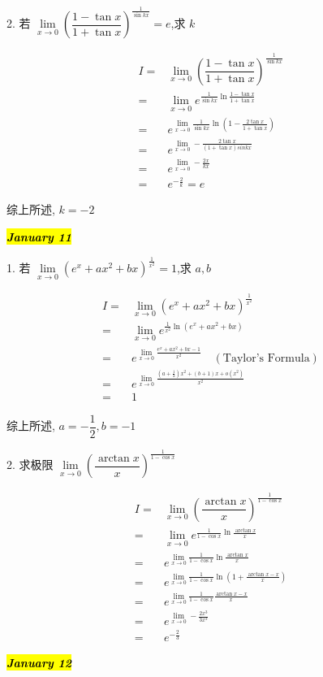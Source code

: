 2. 若 $\lim\limits_{x\to 0}\left(\dfrac{1-\tan x}{1+\tan x}\right)^{\frac{1}{\sin kx}}=e$,求 $k$
\begin{solution}
	
	\begin{align*}
		I = & \lim\limits_{x\to 0}\left(\dfrac{1-\tan x}{1+\tan x} \right)^{\frac{1}{\sin kx}} \\
		  = & \lim\limits_{x\to 0}e^{\frac{1}{\sin kx}\ln\frac{1-\tan x}{1+\tan x}}\\
		  = & e^{\lim\limits_{x\to 0}\frac{1}{\sin kx}\ln(1-\frac{2\tan x}{1+\tan x})}\\
		  = & e^{\lim\limits_{x\to 0}-\frac{2\tan x}{(1+\tan x)sin kx}}\\
		  = & e^{\lim\limits_{x\to 0}-\frac{2x}{kx}}\\
		  = & e^{-\frac{2}{k}} = e
	\end{align*}

	综上所述, $k = -2$
\end{solution}
\hl{\textbf{\textit{January 11}}}

1.  若 $\lim\limits_{x\to 0}(e^{x}+ax^{2}+bx)^{\frac{1}{x^{2}}}=1$,求 $a,b$
\begin{solution}

	\begin{align*}
		I = & \lim\limits_{x\to 0}(e^{x}+ax^{2}+bx)^{\frac{1}{x^{2}}}\\
		  = & \lim\limits_{x\to 0}e^{\frac{1}{x^{2}}\ln(e^{x}+ax^{2}+bx)}\\
		  = & e^{\lim\limits_{x\to 0}\frac{e^{x}+ax^{2}+bx-1}{x^{2}}}\quad (\text{Taylor's Formula})\\
		  = & e^{\lim\limits_{x\to 0}\frac{(a+\frac{1}{2})x^{2}+(b+1)x+o(x^{2})}{x^{2}}}\\
		  = & 1
	\end{align*}

	综上所述, $a = -\dfrac{1}{2}, b = -1$
\end{solution}

2. 求极限 $\lim\limits_{x\to 0}\left(\dfrac{\arctan x}{x}\right)^{\frac{1}{1-\cos x}}$
\begin{solution}
	
	\begin{align*}
		I = & \lim\limits_{x\to 0}\left(\dfrac{\arctan x}{x}\right)^{\frac{1}{1-\cos x}}\\
		  = & \lim\limits_{x\to 0}e^{\frac{1}{1-\cos x}\ln\frac{\arctan x}{x}}\\
		  = & e^{\lim\limits_{x\to 0}\frac{1}{1-\cos x}\ln\frac{\arctan x}{x}}\\
		  = & e^{\lim\limits_{x\to 0}\frac{1}{1-\cos x}\ln(1+\frac{\arctan x-x}{x})}\\
		  = & e^{\lim\limits_{x\to 0}\frac{1}{1-\cos x}\frac{\arctan x-x}{x}}\\
		  = & e^{\lim\limits_{x\to 0}-\frac{2x^{3}}{3x^{3}}}\\
		  = & e^{-\frac{2}{3}}
	\end{align*}
\end{solution}
\hl{\textbf{\textit{January 12}}}

